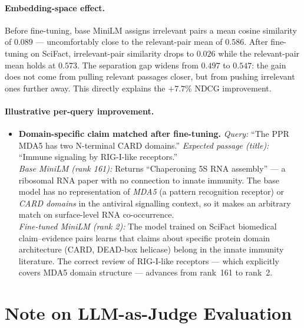 \documentclass[12pt, a4paper]{article}
\newcommand{\scifact}{SciFact}
\begin{document}
\paragraph{Embedding-space effect.}
Before fine-tuning, base MiniLM assigns irrelevant pairs a mean cosine
similarity of $0.089$ — uncomfortably close to the relevant-pair mean of
$0.586$.  After fine-tuning on \scifact{}, irrelevant-pair similarity drops to
$0.026$ while the relevant-pair mean holds at $0.573$.  The separation gap
widens from $0.497$ to $0.547$: the gain does not come from pulling relevant
passages closer, but from pushing irrelevant ones further away.  This directly
explains the $+7.7\%$ NDCG improvement.

\paragraph{Illustrative per-query improvement.}
\begin{itemize}
  \item \textbf{Domain-specific claim matched after fine-tuning.}
        \textit{Query:} ``The PPR MDA5 has two N-terminal CARD domains.''
        \textit{Expected passage (title):} ``Immune signaling by RIG-I-like receptors.''\\
        \textit{Base MiniLM (rank 161):} Returns ``Chaperoning 5S RNA assembly'' — a
        ribosomal RNA paper with no connection to innate immunity. The base model has
        no representation of \textit{MDA5} (a pattern recognition receptor) or
        \textit{CARD domains} in the antiviral signalling context, so it makes an
        arbitrary match on surface-level RNA co-occurrence.\\
        \textit{Fine-tuned MiniLM (rank 2):} The model trained on SciFact
        biomedical claim–evidence pairs learns that claims about specific protein
        domain architecture (CARD, DEAD-box helicase) belong in the innate immunity
        literature.  The correct review of RIG-I-like receptors — which explicitly
        covers MDA5 domain structure — advances from rank~161 to rank~2.
\end{itemize}

\section{Note on LLM-as-Judge Evaluation}
\label{sec:llm_judge}
\end{document}
